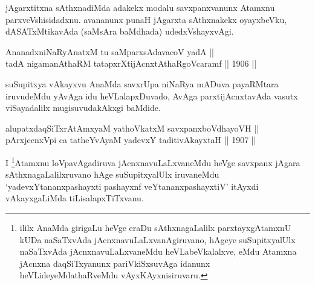 \begin{artha}
jAgarxtitxna sAthxnadiMda adakekx modalu savxpanxvanunx
Atamxnu parxveVshisidadxnu. avananunx punaH jAgarxta sAthxnakekx
oyayxbeVku, dASATxMtikavAda (saMsAra baMdhada) udedxVshayxvAgi.
\end{artha}


\begin{shl}
\footnotemark[2]AnanadxniNaRyAnatxM tu saMparxsAdavacoV yadA || \\
tadA nigamanAthaRM tatapxrXtijAcnxtAthaRgoVcaramf \hfill || 1906 ||
  
\end{shl}

\begin{artha}
suSupitxya vAkayxvu AnaMda savxrUpa
niNaRya mADuva payaRMtara iruvudeMdu yAvAga idu heVLalapxDuvado, AvAga
parxtijAcnxtavAda vasutx viSayadalilx mugisuvudakAkxgi baMdide.
\end{artha}



\begin{shl}
alupatxdaqSiTxrAtAmx\s yaM yathoVkatxM savxpanxboVdhayoVH || \\
pArxjecnxV\s pi ca tatheYvAyaM yadevxY taditivAkayxtaH \hfill || 1907 ||
  
\end{shl}

\begin{artha}
I \footnote{ililx AnaMda girigaLu heVge eraDu sAthxnagaLalilx
parxtayxgAtamxnU kUDa naSaTxvAda jAcnxnavuLaLxvanAgiruvano, hAgeye
suSupitxyalUlx naSaTxvAda jAcnxnavuLaLxvaneMdu heVLabeVkalalxve,
eMdu Atamxna jAcnxna daqSiTxyanunx pariVkiSxsuvAga idanunx
heVLideyeMdathaRveMdu vAyxKAyxnisiruvaru.}Atamxnu loVpavAgadiruva jAcnxnavuLaLxvaneMdu heVge
savxpanx jAgara sAthxnagaLalilxruvano hAge suSupitxyalUlx iruvaneMdu
`yadevxYtananxpashayxti pashayxnf veYtananxpashayxtiV' itAyxdi vAkayxgaLiMda tiLisalapxTiTxvanu.
\end{artha}

